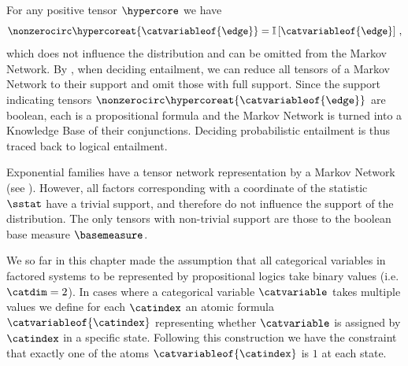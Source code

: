 For any positive tensor $\hypercore$ we have
\[ \nonzerocirc\hypercoreat{\catvariableof{\edge}} = \onesat{\catvariableof{\edge}} \, , \]
which does not influence the distribution and can be omitted from the Markov Network.
By , when deciding entailment, we can reduce all tensors of a Markov Network to their support and omit those with full support.
Since the support indicating tensors $\nonzerocirc\hypercoreat{\catvariableof{\edge}}$ are boolean, each is a propositional formula and the Markov Network is turned into a Knowledge Base of their conjunctions.
Deciding probabilistic entailment is thus traced back to logical entailment.

Exponential families have a tensor network representation by a Markov Network (see ).
However, all factors corresponding with a coordinate of the statistic $\sstat$ have a trivial support, and therefore do not influence the support of the distribution.
The only tensors with non-trivial support are those to the boolean base measure $\basemeasure$.


\label{sec:categoricalTN}

We so far in this chapter made the assumption that all categorical variables in factored systems to be represented by propositional logics take binary values (i.e. $\catdim=2$).
In cases where a categorical variable $\catvariable$ takes multiple values we define for each $\catindex$ an atomic formula $\catvariableof{\catindex}$ representing whether $\catvariable$ is assigned by $\catindex$ in a specific state.
Following this construction we have the constraint that exactly one of the atoms $\catvariableof{\catindex}$ is $1$ at each state.



